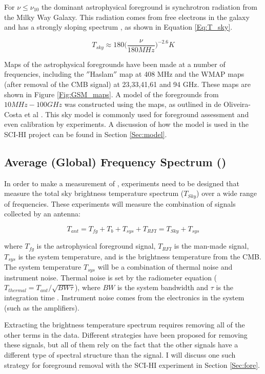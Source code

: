 For $\nu \leq \nu_{10}$ the dominant astrophysical foreground is synchrotron radiation from the Milky Way Galaxy. This radiation comes from free electrons in the galaxy and has a strongly sloping spectrum \cite{furlanetto_2006}, as shown in Equation \ref{Eq:T_sky}. 

\begin{equation}\label{Eq:T_sky}
T_{sky} \approx 180 \Big( \frac{\nu}{180 MHz} \Big)^{-2.6} K
\end{equation}

Maps of the astrophysical foregrounds have been made at a number of frequencies, including the $''$Haslam$''$ map at 408 MHz and the WMAP maps (after removal of the CMB signal) at 23,33,41,61 and 94 GHz. These maps are shown in Figure \ref{Fig:GSM_maps}. A model of the foregrounds from $10 MHz-100 GHz$ was constructed using the maps, as outlined in de Oliveira-Costa et al \cite{GSM_model}. This sky model is commonly used for foreground assessment and even calibration by \cm experiments. A discussion of how the model is used in the SCI-HI project can be found in Section \ref{Sec:model}. 

\subsection{Average (Global) Frequency Spectrum (\avgdtb)}
In order to make a measurement of \avgdtb, experiments need to be designed that measure the total sky brightness temperature spectrum ($T_{Sky}$) over a wide range of frequencies. These experiments will measure the combination of signals collected by an antenna:

\begin{equation}
T_{ant} = T_{fg} + T_b +T_{sys}+T_{RFI} = T_{Sky} + T_{sys}
\end{equation}

where $T_{fg}$ is the astrophysical foreground signal, $T_{RFI}$ is the man-made signal, $T_{sys}$ is the system temperature, and \tb is the brightness temperature from the CMB. The system temperature $T_{sys}$ will be a combination of thermal noise and instrument noise. Thermal noise is set by the radiometer equation ($T_{thermal} = T_{ant}/\sqrt{BW \tau}$), where $BW$ is the system bandwidth and $\tau$ is the integration time \cite{carroll2007}. Instrument noise comes from the electronics in the system (such as the amplifiers). 

Extracting the \cm brightness temperature spectrum requires removing all of the other terms in the data. Different strategies have been proposed for removing these signals, but all of them rely on the fact that the other signals have a different type of spectral structure than the \cm signal. I will discuss one such strategy for foreground removal with the SCI-HI experiment in Section \ref{Sec:fore}. 

